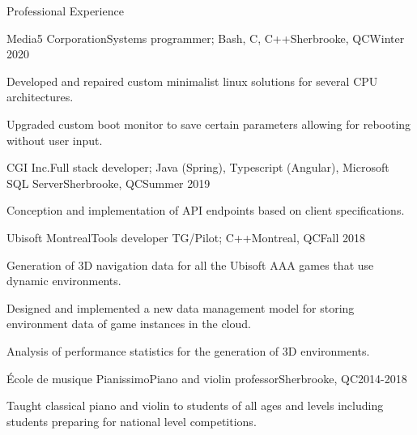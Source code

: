 \documentclass{article}
\newlength{\tabin}
\newlength{\secsep}
\newcommand{\lineunder}{\vspace*{-8pt} \\ \hspace*{-6pt} \hrulefill \\ \vspace*{-15pt}}
\newenvironment{tabbedsection}[1]{
  \begin{list}{}{
      \setlength{\itemsep}{0pt}
      \setlength{\labelsep}{0pt}
      \setlength{\labelwidth}{0pt}
      \setlength{\leftmargin}{\tabin}
      \setlength{\rightmargin}{\tabin}
      \setlength{\listparindent}{0pt}
      \setlength{\parsep}{0pt}
      \setlength{\parskip}{0pt}
      \setlength{\partopsep}{0pt}
      \setlength{\topsep}{#1}
    }
  \item[]
}{\end{list}}
\newenvironment{resume_section}[1]{
  \filbreak
  \vspace{2\secsep}
  \textsc{\large#1}
  \lineunder
  \begin{tabbedsection}{\secsep}
}{\end{tabbedsection}}
\newenvironment{subitems}{
  \renewcommand{\labelitemi}{-}
  \begin{itemize}
      \setlength{\labelsep}{1em}
}{\end{itemize}}
\newenvironment{resume_employer}[4]{
  \vspace{\secsep}
  \textbf{#1} \\ 
  \indent {\small #2} \hfill {\footnotesize#3 (#4)}
  \begin{tabbedsection}{0pt}
  \begin{subitems}
}{\end{subitems}\end{tabbedsection}}
\begin{document}
\begin{resume_section}{Professional Experience}
  \begin{resume_employer}{Media5 Corporation}{Systems programmer; Bash, C, C++}{Sherbrooke, QC}{Winter 2020}
    \item Developed and repaired custom minimalist linux solutions for several CPU architectures.
    \item Upgraded custom boot monitor to save certain parameters allowing for rebooting without user input.
  \end{resume_employer}
  \begin{resume_employer}{CGI Inc.}{Full stack developer; Java (Spring), Typescript (Angular), Microsoft SQL Server}{Sherbrooke, QC}{Summer 2019}
    \item Conception and implementation of API endpoints based on client specifications.
  \end{resume_employer}
  
    \begin{resume_employer}{Ubisoft Montreal}{Tools developer TG/Pilot; C++}{Montreal, QC}{Fall 2018} 
    \item Generation of 3D navigation data for all the Ubisoft AAA games that use dynamic environments.
    \item Designed and implemented a new data management model for storing environment data of game instances in the cloud.
    \item Analysis of performance statistics for the generation of 3D environments.
  \end{resume_employer}
  
  \begin{resume_employer}{École de musique Pianissimo}{Piano and violin professor}{Sherbrooke, QC}{2014-2018}
    \item Taught classical piano and violin to students of all ages and levels including students preparing for national level competitions.
  \end{resume_employer}
\end{resume_section}
\end{document}
